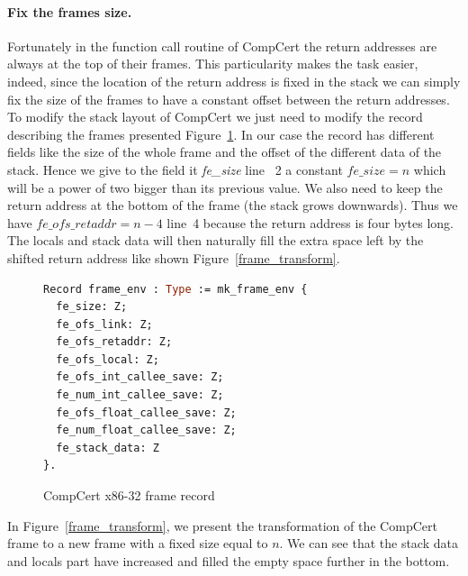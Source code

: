 \documentclass[11pt]{sdm}
\begin{document}
\paragraph{Fix the frames size.}
\label{par:Fix the frames size}

Fortunately in the function call routine of CompCert the return addresses are always at the top of their frames.
This particularity makes the task easier, indeed, since the location of the return address is fixed in the stack we can simply fix the size of the frames to have a constant offset between the return addresses. \\
To modify the stack layout of CompCert we just need to modify the record describing the frames presented Figure~\ref{frame_record}. In our case the record has different fields like the size of the whole frame and the offset of the different data of the stack. Hence we give to the field it \textit{fe\_size} line ~2 a constant $fe\_size=n$ which will be a power of two bigger than its previous value. We also need to keep the return address at the bottom of the frame (the stack grows downwards). Thus we have $fe\_ofs\_retaddr=n-4$ line~4 because the return address is four bytes long. The locals and stack data will then naturally fill the extra space left by the shifted return address like shown Figure~\ref{frame_transform}.

\begin{figure}[!ht]
\centering
\begin{lstlisting}[language=Caml]
Record frame_env : Type := mk_frame_env {
  fe_size: Z;
  fe_ofs_link: Z;
  fe_ofs_retaddr: Z;
  fe_ofs_local: Z;
  fe_ofs_int_callee_save: Z;
  fe_num_int_callee_save: Z;
  fe_ofs_float_callee_save: Z;
  fe_num_float_callee_save: Z;
  fe_stack_data: Z
}.
\end{lstlisting}
\caption{CompCert x86-32 frame record}
\label{frame_record}
\end{figure}

In Figure~\ref{frame_transform}, we present the transformation of the CompCert frame to a new frame with a fixed size equal to $n$. We can see that the stack data and locals part have increased and filled the empty space further in the bottom.
\end{document}
